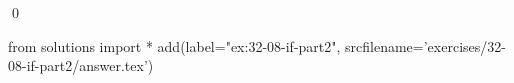 
\begin{ex}
  \label{ex:32-08-if-part2}
  
  \qed
\end{ex}
\begin{python0}
from solutions import *
add(label="ex:32-08-if-part2",
    srcfilename='exercises/32-08-if-part2/answer.tex')
\end{python0}
